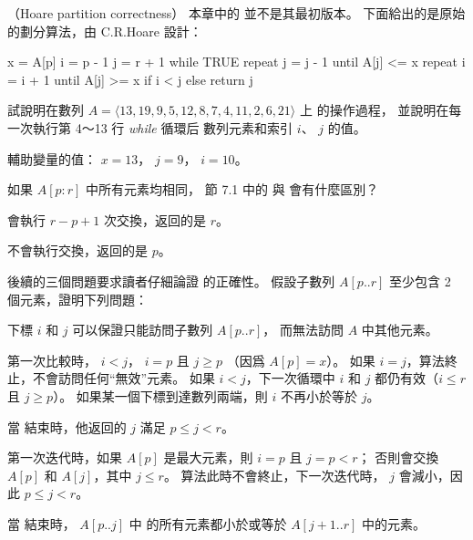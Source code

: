 \startPROBLEM
（Hoare partition correctness）
本章中的  並不是其最初版本。
下面給出的是原始的劃分算法，由 C.R.Hoare 設計：

\startCLRSCODE
x = A[p]
i = p - 1
j = r + 1
while TRUE
	repeat
		j = j - 1
	until A[j] <= x
	repeat
		i = i + 1
	until A[j] >= x
	if i < j
	else
		return j
\stopCLRSCODE

\startigBase[a]
\item 試說明在數列 $A = \langle 13, 19, 9, 5, 12, 8, 7, 4, 11, 2, 6, 21 \rangle$ 上
  的操作過程，
並說明在每一次執行第 4～13 行 \emph{while} 循環后
數列元素和索引 $i$、 $j$ 的值。
\stopigBase

\startANSWER
輔助變量的值： $x = 13$， $j = 9$， $i = 10$。

{\externalfigure[output/p7_1_a-1]}
{\externalfigure[output/p7_1_a-2]}
{\externalfigure[output/p7_1_a-3]}
\stopANSWER

\startigBase[a,continue]\startitem
如果 $A[p:r]$ 中所有元素均相同，
節 7.1 中的  與  會有什麼區別？
\stopitem\stopigBase

\startANSWER
{} 會執行 $r-p+1$ 次交換，返回的是 $r$。

 不會執行交換，返回的是 $p$。
\stopANSWER

後續的三個問題要求讀者仔細論證  的正確性。
假設子數列 $A[p..r]$ 至少包含 2 個元素，證明下列問題：
\startigBase[a,continue]
\item 下標 $i$ 和 $j$ 可以保證只能訪問子數列 $A[p..r]$，
而無法訪問 $A$ 中其他元素。
\stopigBase

\startANSWER
第一次比較時， $i < j$， $i=p$ 且 $j\ge p$ （因爲 $A[p]=x$）。
如果 $i=j$，算法終止，不會訪問任何“無效”元素。
如果 $i<j$，下一次循環中 $i$ 和 $j$ 都仍有效（$i\le r$ 且 $j\ge p$）。
如果某一個下標到達數列兩端，則 $i$ 不再小於等於 $j$。
\stopANSWER

\startigBase[a,continue]
\item 當  結束時，他返回的 $j$ 滿足 $p\le j < r$。
\stopigBase

\startANSWER
第一次迭代時，如果 $A[p]$ 是最大元素，則 $i=p$ 且 $j=p<r$；
否則會交換 $A[p]$ 和 $A[j]$，其中 $j\le r$。
算法此時不會終止，下一次迭代時， $j$ 會減小，因此 $p\le j < r$。
\stopANSWER

\startigBase[a,continue]
\item 當  結束時， $A[p..j]$ 中
的所有元素都小於或等於 $A[j+1..r]$ 中的元素。
\stopigBase

